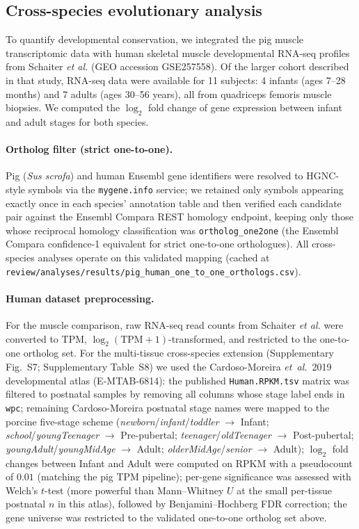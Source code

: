 \documentclass[10pt,a4paper]{article}
\begin{document}
\subsection{Cross-species evolutionary analysis}

To quantify developmental conservation, we integrated the pig muscle transcriptomic data with human skeletal muscle developmental RNA-seq profiles from Schaiter \textit{et al.}\cite{schaiter_molecular_2024} (GEO accession GSE257558). Of the larger cohort described in that study, RNA-seq data were available for 11 subjects: 4 infants (ages 7--28 months) and 7 adults (ages 30--56 years), all from quadriceps femoris muscle biopsies. We computed the $\log_2$ fold change of gene expression between infant and adult stages for both species.

\paragraph{Ortholog filter (strict one-to-one).} Pig (\textit{Sus scrofa}) and human Ensembl gene identifiers were resolved to HGNC-style symbols via the \texttt{mygene.info} service; we retained only symbols appearing exactly once in each species' annotation table and then verified each candidate pair against the Ensembl Compara REST homology endpoint, keeping only those whose reciprocal homology classification was \texttt{ortholog\_one2one} (the Ensembl Compara confidence-1 equivalent for strict one-to-one orthologues). All cross-species analyses operate on this validated mapping (cached at \texttt{review/analyses/results/pig\_human\_one\_to\_one\_orthologs.csv}).

\paragraph{Human dataset preprocessing.} For the muscle comparison, raw RNA-seq read counts from Schaiter \textit{et al.}\cite{schaiter_molecular_2024} were converted to TPM, $\log_2(\mathrm{TPM}+1)$-transformed, and restricted to the one-to-one ortholog set. For the multi-tissue cross-species extension (Supplementary Fig.~S7; Supplementary Table~S8) we used the Cardoso-Moreira \textit{et~al.}~2019 developmental atlas\cite{cardoso-moreira_gene_2019} (E-MTAB-6814): the published \texttt{Human.RPKM.tsv} matrix was filtered to postnatal samples by removing all columns whose stage label ends in \texttt{wpc}; remaining Cardoso-Moreira postnatal stage names were mapped to the porcine five-stage scheme (\emph{newborn}/\emph{infant}/\emph{toddler} $\rightarrow$ Infant; \emph{school}/\emph{youngTeenager} $\rightarrow$ Pre-pubertal; \emph{teenager}/\emph{oldTeenager} $\rightarrow$ Post-pubertal; \emph{youngAdult}/\emph{youngMidAge} $\rightarrow$ Adult; \emph{olderMidAge}/\emph{senior} $\rightarrow$ Adult); $\log_2$ fold changes between Infant and Adult were computed on RPKM with a pseudocount of $0.01$ (matching the pig TPM pipeline); per-gene significance was assessed with Welch's $t$-test (more powerful than Mann--Whitney $U$ at the small per-tissue postnatal $n$ in this atlas), followed by Benjamini--Hochberg FDR correction; the gene universe was restricted to the validated one-to-one ortholog set above.
\end{document}
